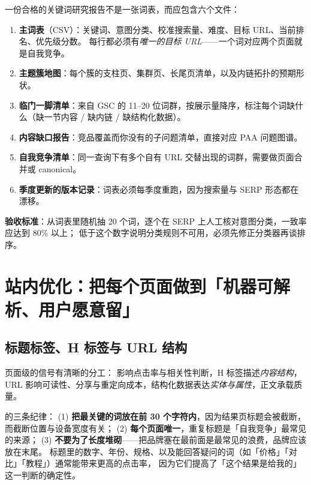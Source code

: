 \begin{toolbox}[关键词研究的交付物清单]
一份合格的关键词研究报告不是一张词表，而应包含六个文件：
\begin{enumerate}
  \item \textbf{主词表}（CSV）：关键词、意图分类、校准搜索量、难度、目标 URL、当前排名、优先级分数。
        每行都必须有\emph{唯一的目标 URL}——一个词对应两个页面就是自我竞争。
  \item \textbf{主题簇地图}：每个簇的支柱页、集群页、长尾页清单，以及内链拓扑的预期形状。
  \item \textbf{临门一脚清单}：来自 GSC 的 11--20 位词群，按展示量降序，标注每个词缺什么（缺一节内容 / 缺内链 / 缺结构化数据）。
  \item \textbf{内容缺口报告}：竞品覆盖而你没有的子问题清单，直接对应 PAA 问题图谱。
  \item \textbf{自我竞争清单}：同一查询下有多个自有 URL 交替出现的词群，需要做页面合并或 canonical。
  \item \textbf{季度更新的版本记录}：词表必须每季度重跑，因为搜索量与 SERP 形态都在漂移。
\end{enumerate}
\textbf{验收标准}：从词表里随机抽 20 个词，逐个在 SERP 上人工核对意图分类，一致率应达到 80\% 以上；
低于这个数字说明分类规则不可用，必须先修正分类器再谈排序。
\end{toolbox}

\section{站内优化：把每个页面做到「机器可解析、用户愿意留」}
\label{sec:seo-onpage}

\subsection{标题标签、H 标签与 URL 结构}

页面级的信号有清晰的分工： 影响点击率与相关性判断，H 标签描述\emph{内容结构}，
URL 影响可读性、分享与重定向成本，结构化数据表达\emph{实体与属性}，正文承载质量。

 的三条纪律：
(1) \textbf{把最关键的词放在前 30 个字符内}，因为结果页标题会被截断，而截断位置与设备宽度有关；
(2) \textbf{每个页面唯一}，重复标题是「自我竞争」最常见的来源；
(3) \textbf{不要为了长度堆砌}——把品牌塞在最前面是最常见的浪费，品牌应该放在末尾。
标题里的数字、年份、规格、以及能回答疑问的词（如「价格」「对比」「教程」）通常能带来更高的点击率，
因为它们提高了「这个结果是给我的」这一判断的确定性。

